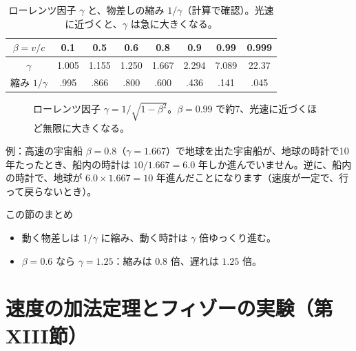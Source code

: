 \documentclass[a4paper,11pt,openany]{ltjsbook}
\begin{document}
\begin{table}[htbp]
\centering
\begin{tabular}{c|ccccccc}
\toprule
$\beta=v/c$ & 0.1 & 0.5 & 0.6 & 0.8 & 0.9 & 0.99 & 0.999\\
\midrule
$\gamma$ & 1.005 & 1.155 & 1.250 & 1.667 & 2.294 & 7.089 & 22.37\\
縮み $1/\gamma$ & .995 & .866 & .800 & .600 & .436 & .141 & .045\\
\bottomrule
\end{tabular}
\caption{ローレンツ因子 $\gamma$ と、物差しの縮み $1/\gamma$（計算で確認）。光速に近づくと、$\gamma$ は急に大きくなる。}
\end{table}

\begin{figure}[htbp]
\centering
{}
\caption{ローレンツ因子 $\gamma=1/\sqrt{1-\beta^2}$。$\beta=0.99$ で約7、光速に近づくほど無限に大きくなる。}
\end{figure}

\begin{examplebox}{例：高速の宇宙船}
$\beta=0.8$（$\gamma=1.667$）で地球を出た宇宙船が、地球の時計で10年たったとき、船内の時計は $10/1.667=6.0$ 年しか進んでいません。逆に、船内の時計で、地球が $6.0\times1.667=10$ 年進んだことになります（速度が一定で、行って戻らないとき）。
\end{examplebox}

\begin{pointbox}{この節のまとめ}
\begin{itemize}[leftmargin=*]
\item 動く物差しは $1/\gamma$ に縮み、動く時計は $\gamma$ 倍ゆっくり進む。
\item $\beta=0.6$ なら $\gamma=1.25$：縮みは $0.8$ 倍、遅れは $1.25$ 倍。
\end{itemize}
\end{pointbox}

\chapter{速度の加法定理とフィゾーの実験（第XIII節）}
\end{document}
